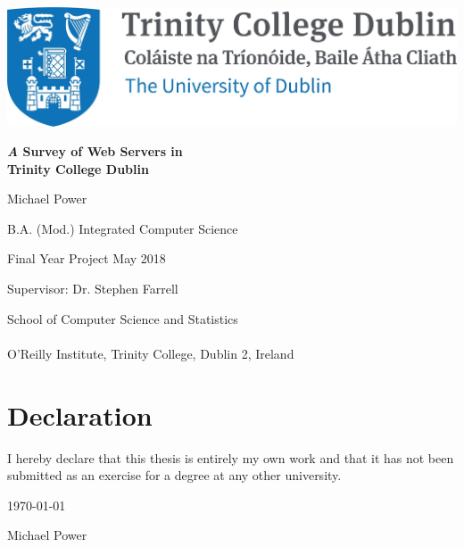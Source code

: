 \documentclass[a4wide,leqno,12pt]{report}
\begin{document}
\sloppy
\bgroup %
\linespread{0}
\thispagestyle{empty}
\begin{center}
{\sffamily

\vspace{10pt}

\includegraphics[scale=1.1]{images/tcd.png}

\vspace{10pt}


\vspace{80pt}

\textbf{ \Large \emph A Survey of Web Servers in\\ Trinity College Dublin}

\vspace{30pt}

Michael Power

B.A. (Mod.) Integrated Computer Science

Final Year Project May 2018

Supervisor: Dr. Stephen Farrell

\vspace{110pt}

\large{School of Computer Science and Statistics
\\$ $\\
O'Reilly Institute, Trinity College, Dublin 2, Ireland}
\linespread{1}
}
\end{center}
\egroup %

\chapter*{Declaration}
I hereby declare that this thesis is entirely my own work and that it
has not been submitted as an exercise for a degree at any other
university.

\begin{center}
\vspace*{2in}

\underline{\hspace*{3in}} \today

Michael Power
\end{center}
\end{document}
